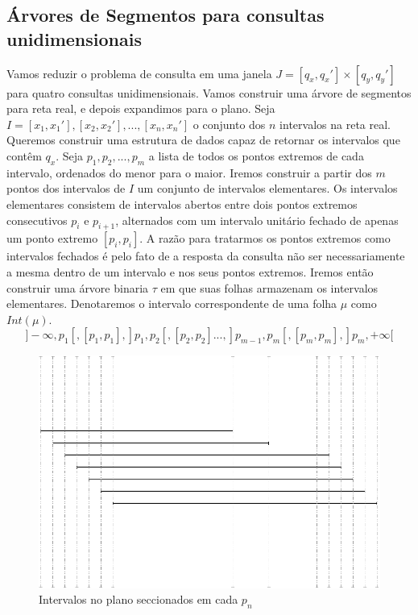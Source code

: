 \subsection{Árvores de Segmentos para consultas unidimensionais}

Vamos %
reduzir o problema de consulta em uma janela $J = [q_x, q_x'] \times [q_y, q_y']$ para quatro consultas unidimensionais. Vamos construir uma árvore de segmentos para reta real, e depois expandimos para o plano. Seja $I={[x_1, x_1'], [x_2, x_2'], ... , [x_n, x_n'] }$ o conjunto dos $n$ intervalos na reta real. Queremos construir uma estrutura de dados capaz de retornar os intervalos que contêm $q_x$. Seja $p_1, p_2, ..., p_m$ a lista de todos os pontos extremos de cada intervalo, ordenados do menor para o maior. Iremos construir a partir dos $m$ pontos dos intervalos de $I$ um conjunto de intervalos elementares. Os intervalos elementares consistem de intervalos abertos entre dois pontos extremos consecutivos $p_i$ e $p_{i+1}$, alternados com um intervalo unitário fechado de apenas um ponto extremo $[p_i, p_i]$. A razão para tratarmos os pontos extremos como intervalos fechados é pelo fato de a resposta da consulta não ser necessariamente a mesma dentro de um intervalo e nos seus pontos extremos. Iremos então construir uma árvore binaria $\tau$ em que suas folhas armazenam os intervalos elementares. Denotaremos o intervalo correspondente de uma folha $\mu$ como $Int(\mu)$.
\[
    ]-\infty, p_1[, [p_1, p_1], ]p_1, p_2[, [p_2, p_2] ... , ]p_{m-1}, p_m[, [p_m, p_m], ]p_m, +\infty [
\]

\begin{figure}[h!]
    \centering
    \includegraphics[scale=0.4]{images/elementary_segments.pdf}
    \caption{Intervalos no plano seccionados em cada $p_n$ }
    \label{fig:intervals_sected}
\end{figure}

